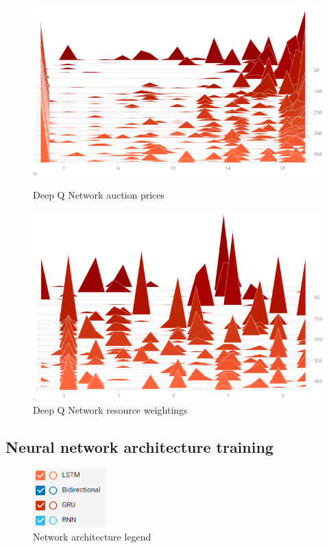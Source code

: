 \begin{figure}[H]
    \centering
    \begin{minipage}{0.5\textwidth}
        \centering
        \includegraphics[width=1.0\textwidth]{figures/5_evaluation_figs/algo_training_fig/dqn_auction_prices.png}
        \caption{Deep Q Network auction prices}
        \label{fig:dqn-auction-prices}
    \end{minipage}\hfill
    \begin{minipage}{0.5\textwidth}
        \centering
        \includegraphics[width=1.0\textwidth]{figures/5_evaluation_figs/algo_training_fig/dqn_weightings.png}
        \caption{Deep Q Network resource weightings}
        \label{fig:dqn-resource-weightings}
    \end{minipage}
\end{figure}


\subsection{Neural network architecture training}\label{subsec:neural-network-architecture-training}
\begin{figure}
    \includegraphics[width=0.25\textwidth]{figures/5_evaluation_figs/net_arch_training_fig/legend.png}
    \caption{Network architecture legend}
    \label{fig:net-arch-training-legend}
\end{figure}

